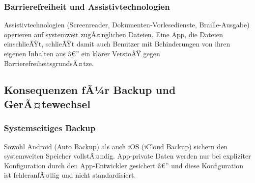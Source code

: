 ﻿\documentclass[12pt, a4paper]{article}
\begin{document}
\subsubsection{Barrierefreiheit und Assistivtechnologien}

Assistivtechnologien (Screenreader, Dokumenten-Vorlesedienste, Braille-Ausgabe)
operieren auf systemweit zugÃ¤nglichen Dateien. Eine App, die Dateien einschlieÃŸt,
schlieÃŸt damit auch Benutzer mit Behinderungen von ihren eigenen Inhalten aus â€”
ein klarer VerstoÃŸ gegen BarrierefreiheitsgrundsÃ¤tze.

\subsection{Konsequenzen fÃ¼r Backup und GerÃ¤tewechsel}

\subsubsection{Systemseitiges Backup}

Sowohl Android (Auto Backup) als auch iOS (iCloud Backup) sichern den systemweiten
Speicher vollstÃ¤ndig. App-private Daten werden nur bei expliziter Konfiguration
durch den App-Entwickler gesichert â€” und diese Konfiguration ist fehleranfÃ¤llig
und nicht standardisiert.
\end{document}
